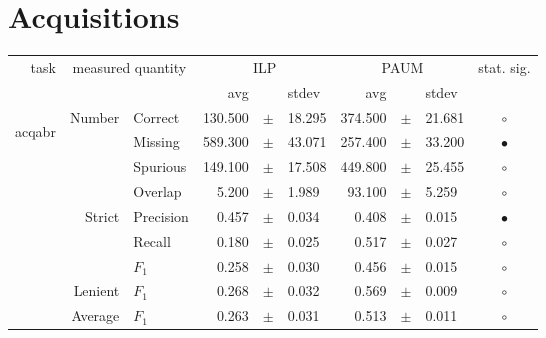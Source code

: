 \clearpage

\section{Acquisitions} \label{sec:complete_eval_acq}


\begin{longtable}{|r|r|l||rcl|rcl|c|}
\hline
\multirow{2}{*}{task} & \multicolumn{2}{|c||}{\multirow{2}{*}{measured quantity}} & \multicolumn{3}{|c|}{ILP} & \multicolumn{3}{|c|}{PAUM} & \multirow{2}{*}{ stat. sig.}\\
\cline{4-9}
  & \multicolumn{2}{|c||}{} &  avg  &    &  stdev  &  avg  &    &  stdev  & \\
\hline
\endhead
\hline
\hline
\multirow{11}{*}{\begin{sideways}acqabr\end{sideways} }
             & \multirow{4}{*}{    Number} &         Correct &     130.500 &  $\pm$  &      18.295 &     374.500 &  $\pm$  &      21.681 & $\circ$ \\
\cline{3-10} &                             &         Missing &     589.300 &  $\pm$  &      43.071 &     257.400 &  $\pm$  &      33.200 & $\bullet$ \\
\cline{3-10} &                             &        Spurious &     149.100 &  $\pm$  &      17.508 &     449.800 &  $\pm$  &      25.455 & $\circ$ \\
\cline{3-10} &                             &         Overlap &       5.200 &  $\pm$  &       1.989 &      93.100 &  $\pm$  &       5.259 & $\circ$ \\
\cline{2-10} & \multirow{3}{*}{    Strict} &       Precision &       0.457 &  $\pm$  &       0.034 &       0.408 &  $\pm$  &       0.015 & $\bullet$ \\
\cline{3-10} &                             &          Recall &       0.180 &  $\pm$  &       0.025 &       0.517 &  $\pm$  &       0.027 & $\circ$ \\
\cline{3-10} &                             &           $F_1$ &       0.258 &  $\pm$  &       0.030 &       0.456 &  $\pm$  &       0.015 & $\circ$ \\
\cline{2-10} &                     Lenient &           $F_1$ &       0.268 &  $\pm$  &       0.032 &       0.569 &  $\pm$  &       0.009 & $\circ$ \\
\cline{2-10} &                     Average &           $F_1$ &       0.263 &  $\pm$  &       0.031 &       0.513 &  $\pm$  &       0.011 & $\circ$ \\

\end{longtable}
